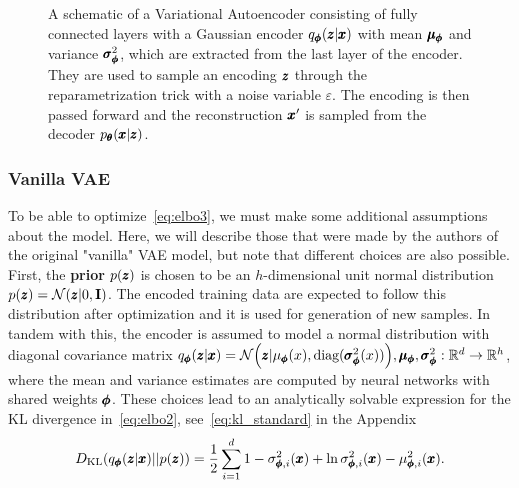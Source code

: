 \begin{figure}
\centering{}
\caption{A schematic of a Variational Autoencoder consisting of fully connected layers with a Gaussian encoder $q_{\pmb{{\phi}}}(\pmb{{z}}|\pmb{{x}})$ with mean $\pmb{{\mu}}_{\pmb{{\phi}}}$ and variance $\pmb{{\sigma}}^2_{\pmb{{\phi}}}$, which are extracted from the last layer of the encoder. They are used to sample an encoding $\pmb{{z}}$ through the reparametrization trick with a noise variable $\varepsilon$. The encoding is then passed forward and the reconstruction $\pmb{{x}}'$ is sampled from the decoder $p_{\pmb{{\theta}}}(\pmb{{x}}|\pmb{{z}})$.}
\label{fig:vae}
\end{figure}

\subsubsection{Vanilla VAE}
To be able to optimize~\eqref{eq:elbo3}, we must make some additional assumptions about the model. Here, we will describe those that were made by the authors of the original "vanilla" VAE model, but note that different choices are also possible. First, the \textbf{prior} $p(\pmb{{z}})$ is chosen to be an $h$-dimensional unit normal distribution $p(\pmb{{z}})=\mathcal{N}(\pmb{{z}}|0,\textbf{I})$. The encoded training data are expected to follow this distribution after optimization and it is used for generation of new samples. In tandem with this, the encoder is assumed to model a normal distribution with diagonal covariance matrix $q_{\vc{\phi}}(\vc{z}|\vc{x})=\mathcal{N}\left(\vc{z}|\mu_{\vc{\phi}}(x), \text{diag}(\vc{\sigma}^2_{\vc{\phi}}(x))\right), \vc{\mu}_{\vc{\phi}}, \vc{\sigma}^2_{\vc{\phi}}:\mathbb{R}^d \rightarrow \mathbb{R}^h$, where the mean and variance estimates are computed by neural networks with shared weights $\pmb{{\phi}}$. These choices lead to an analytically solvable expression for the KL divergence in~\eqref{eq:elbo2}, see~\eqref{eq:kl_standard} in the Appendix
\begin{equation} \label{eq:vae_kld}
D_{\text{KL}}\left(q_{\vc{\phi}}(\vc{z}|\vc{x})||p(\vc{z}) \right) = \frac{1}{2}\sum_{i=1}^{d} 1-\sigma_{\vc{\phi},i}^{2}(\vc{x})+\ln \sigma_{\vc{\phi},i}^{2}(\vc{x}) -\mu_{\vc{\phi},i}^{2}(\vc{x}).
\end{equation}

